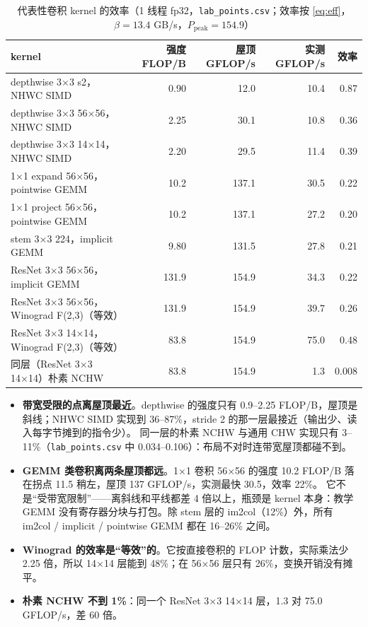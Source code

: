 \documentclass[11pt,a4paper]{ctexart}
\begin{document}
\begin{table}[H]
\centering\small
\caption{代表性卷积 kernel 的效率（1 线程 fp32，\texttt{lab\_points.csv}；效率按 \cref{eq:eff}，$\beta = 13.4$ GB/s，$P_{\text{peak}} = 154.9$）}\label{tab:kernels}
\begin{tabular}{lrrrr}
\toprule
kernel & 强度 FLOP/B & 屋顶 GFLOP/s & 实测 GFLOP/s & 效率 \\
\midrule
depthwise 3×3 s2，NHWC SIMD & 0.90 & 12.0 & 10.4 & 0.87 \\
depthwise 3×3 56×56，NHWC SIMD & 2.25 & 30.1 & 10.8 & 0.36 \\
depthwise 3×3 14×14，NHWC SIMD & 2.20 & 29.5 & 11.4 & 0.39 \\
1×1 expand 56×56，pointwise GEMM & 10.2 & 137.1 & 30.5 & 0.22 \\
1×1 project 56×56，pointwise GEMM & 10.2 & 137.1 & 27.2 & 0.20 \\
stem 3×3 224，implicit GEMM & 9.80 & 131.5 & 27.8 & 0.21 \\
ResNet 3×3 56×56，implicit GEMM & 131.9 & 154.9 & 34.3 & 0.22 \\
ResNet 3×3 56×56，Winograd F(2,3)（等效） & 131.9 & 154.9 & 39.7 & 0.26 \\
ResNet 3×3 14×14，Winograd F(2,3)（等效） & 83.8 & 154.9 & 75.0 & 0.48 \\
同层（ResNet 3×3 14×14）朴素 NCHW & 83.8 & 154.9 & 1.3 & 0.008 \\
\bottomrule
\end{tabular}
\end{table}

\begin{itemize}
  \item \textbf{带宽受限的点离屋顶最近}。depthwise 的强度只有 0.9--2.25 FLOP/B，屋顶是斜线；NHWC SIMD 实现到 36--87\%，stride 2 的那一层最接近（输出少、读入每字节摊到的指令少）。
  同一层的朴素 NCHW 与通用 CHW 实现只有 3--11\%（\texttt{lab\_points.csv} 中 0.034--0.106）：布局不对时连带宽屋顶都碰不到。
  \item \textbf{GEMM 类卷积离两条屋顶都远}。1×1 卷积 56×56 的强度 10.2 FLOP/B 落在拐点 11.5 稍左，屋顶 137 GFLOP/s，实测最快 30.5，效率 22\%。
  它不是“受带宽限制”——离斜线和平线都差 4 倍以上，瓶颈是 kernel 本身：教学 GEMM 没有寄存器分块与打包。除 stem 层的 im2col（12\%）外，所有 im2col / implicit / pointwise GEMM 都在 16--26\% 之间。
  \item \textbf{Winograd 的效率是“等效”的}。它按直接卷积的 FLOP 计数，实际乘法少 2.25 倍，所以 14×14 层能到 48\%；在 56×56 层只有 26\%，变换开销没有摊平。
  \item \textbf{朴素 NCHW 不到 1\%}：同一个 ResNet 3×3 14×14 层，1.3 对 75.0 GFLOP/s，差 60 倍。
\end{itemize}
\end{document}
